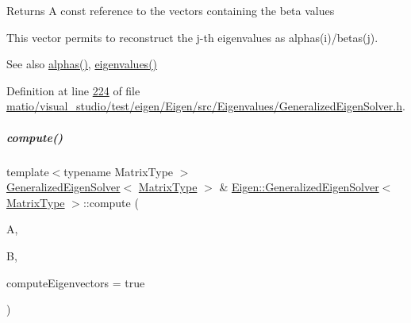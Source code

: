 \begin{DoxyReturn}{Returns}
A const reference to the vectors containing the beta values
\end{DoxyReturn}
This vector permits to reconstruct the j-\/th eigenvalues as alphas(i)/betas(j).

\begin{DoxySeeAlso}{See also}
\hyperlink{group___eigenvalues___module_a82b1bc41267f46e5c5899d5b084a73bb}{alphas()}, \hyperlink{group___eigenvalues___module_a62f01cd78271efd5e39bcb24e0fe1a58}{eigenvalues()} 
\end{DoxySeeAlso}


Definition at line \hyperlink{matio_2visual__studio_2test_2eigen_2_eigen_2src_2_eigenvalues_2_generalized_eigen_solver_8h_source_l00224}{224} of file \hyperlink{matio_2visual__studio_2test_2eigen_2_eigen_2src_2_eigenvalues_2_generalized_eigen_solver_8h_source}{matio/visual\+\_\+studio/test/eigen/\+Eigen/src/\+Eigenvalues/\+Generalized\+Eigen\+Solver.\+h}.

\mbox{\label{group___eigenvalues___module_a275910b47dfe5f40211dcb59cfd68f3c}} 
\subparagraph{\texorpdfstring{compute()}{compute()}\hspace{0.1cm}{\footnotesize\ttfamily [1/2]}}
{\footnotesize\ttfamily template$<$typename Matrix\+Type $>$ \\
\hyperlink{group___eigenvalues___module_class_eigen_1_1_generalized_eigen_solver}{Generalized\+Eigen\+Solver}$<$ \hyperlink{group___eigenvalues___module_a56f4b9823bb9a267de3aaf48428cd247}{Matrix\+Type} $>$ \& \hyperlink{group___eigenvalues___module_class_eigen_1_1_generalized_eigen_solver}{Eigen\+::\+Generalized\+Eigen\+Solver}$<$ \hyperlink{group___eigenvalues___module_a56f4b9823bb9a267de3aaf48428cd247}{Matrix\+Type} $>$\+::compute (\begin{DoxyParamCaption}\item[{const \hyperlink{group___eigenvalues___module_a56f4b9823bb9a267de3aaf48428cd247}{Matrix\+Type} \&}]{A,  }\item[{const \hyperlink{group___eigenvalues___module_a56f4b9823bb9a267de3aaf48428cd247}{Matrix\+Type} \&}]{B,  }\item[{bool}]{compute\+Eigenvectors = {\ttfamily true} }\end{DoxyParamCaption})}



